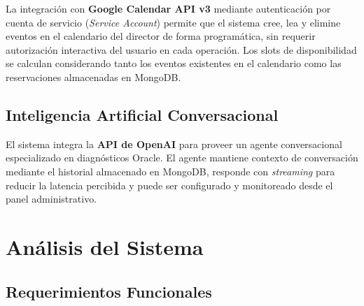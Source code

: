 \documentclass[12pt, a4paper, twoside]{report}
\begin{document}
La integración con \textbf{Google Calendar API v3} mediante autenticación por cuenta de
servicio (\textit{Service Account}) permite que el sistema cree, lea y elimine eventos en el
calendario del director de forma programática, sin requerir autorización interactiva del
usuario en cada operación. Los slots de disponibilidad se calculan considerando tanto los
eventos existentes en el calendario como las reservaciones almacenadas en MongoDB.

\section{Inteligencia Artificial Conversacional}

El sistema integra la \textbf{API de OpenAI} para proveer un agente conversacional
especializado en diagnósticos Oracle. El agente mantiene contexto de conversación mediante
el historial almacenado en MongoDB, responde con \textit{streaming} para reducir la latencia
percibida y puede ser configurado y monitoreado desde el panel administrativo.

\clearpage
\chapter{Análisis del Sistema}

\section{Requerimientos Funcionales}
\end{document}
